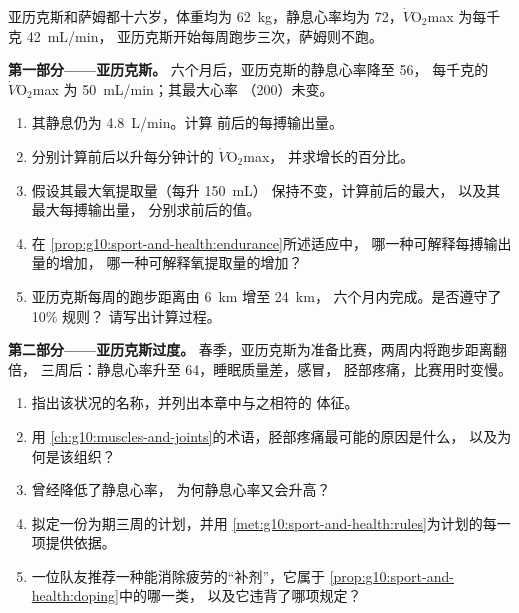\begin{problem}
\label{pb:g10:sport-and-health:1}
亚历克斯和萨姆都十六岁，体重均为 \qty{62}{kg}，静息心率均为
72，$\dot V\!\mathrm{O_2}$max 为每千克 \qty{42}{mL/min}，
亚历克斯开始每周跑步三次，萨姆则不跑。

\medskip
\noindent\textbf{第一部分——亚历克斯。}
六个月后，亚历克斯的静息心率降至 56，
每千克的 $\dot V\!\mathrm{O_2}$max 为 \qty{50}{mL/min}；其最大心率
（200）未变。
\begin{enumerate}
  \item 其静息仍为 \qty{4.8}{L/min}。计算
        前后的每搏输出量。
  \item 分别计算前后以升每分钟计的 $\dot V\!\mathrm{O_2}$max，
        并求增长的百分比。
  \item 假设其最大氧提取量（每升 \qty{150}{mL}）
        保持不变，计算前后的最大，
        以及其最大每搏输出量，
        分别求前后的值。
  \item 在
        \cref{prop:g10:sport-and-health:endurance}所述适应中，
        哪一种可解释每搏输出量的增加，
        哪一种可解释氧提取量的增加？
  \item 亚历克斯每周的跑步距离由 \qty{6}{km} 增至 \qty{24}{km}，
        六个月内完成。是否遵守了 10\% 规则？
        请写出计算过程。
\end{enumerate}

\medskip
\noindent\textbf{第二部分——亚历克斯过度。}
春季，亚历克斯为准备比赛，两周内将跑步距离翻倍，
三周后：静息心率升至 64，睡眠质量差，感冒，
胫部疼痛，比赛用时变慢。
\begin{enumerate}[resume]
  \item 指出该状况的名称，并列出本章中与之相符的
        体征。
  \item 用
        \cref{ch:g10:muscles-and-joints}的术语，胫部疼痛最可能的原因是什么，
        以及为何是该组织？
  \item {}曾经降低了静息心率，
        为何静息心率又会升高？
  \item 拟定一份为期三周的计划，并用
        \cref{met:g10:sport-and-health:rules}为计划的每一项提供依据。
  \item 一位队友推荐一种能消除疲劳的“补剂”，它属于
        \cref{prop:g10:sport-and-health:doping}中的哪一类，
        以及它违背了哪项规定？
\end{enumerate}


\end{problem}
